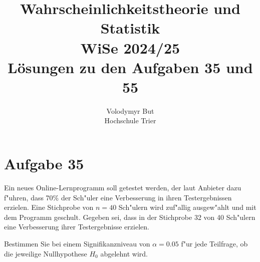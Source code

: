\documentclass[10pt, oneside]{article}
\title{Wahrscheinlichkeitstheorie und Statistik\\[10pt]\Large{WiSe 2024/25}\\[15pt]\Large{L{\"o}sungen zu den Aufgaben 35 und 55}}
\author{Volodymyr But\\[10pt]Hochschule Trier}
\date{}
\begin{document}
\sloppy

\maketitle
\vspace{25px}

\section{Aufgabe 35}

Ein neues Online-Lernprogramm soll getestet werden, der laut Anbieter dazu
f"uhren, dass 70\% der Sch"uler eine Verbesserung in ihren Testergebnissen
erzielen. Eine Stichprobe von $n = 40$ Sch"ulern wird zuf"allig ausgew"ahlt und
mit dem Programm geschult. Gegeben sei, dass in der Stichprobe 32 von 40
Sch"ulern eine Verbesserung ihrer Testergebnisse erzielen.

Bestimmen Sie bei einem Signifikanzniveau von $\alpha = 0.05$ f"ur jede
Teilfrage, ob die jeweilige Nullhypothese $H_0$ abgelehnt wird.
\end{document}
